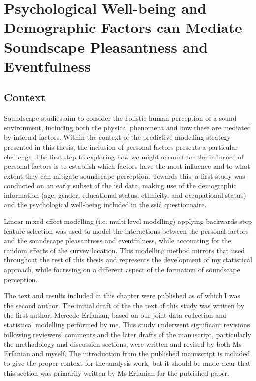 \chapter{Psychological Well-being and Demographic Factors can Mediate Soundscape Pleasantness and Eventfulness}
\label{ch:whostudy}

\section*{Context}

Soundscape studies aim to consider the holistic human perception of a sound environment, including both the physical phenomena and how these are mediated by internal factors. Within the context of the predictive modelling strategy presented in this thesis, the inclusion of personal factors presents a particular challenge. The first step to exploring how we might account for the influence of personal factors is to establish which factors have the most influence and to what extent they can mitigate soundscape perception. Towards this, a first study was conducted on an early subset of the \gls{isd} data, making use of the demographic information (age, gender, educational status, ethnicity, and occupational status) and the psychological well-being included in the \gls{ssid} questionnaire.

Linear mixed-effect modelling (i.e. multi-level modelling) applying backwards-step feature selection was used to model the interactions between the personal factors and the soundscape pleasantness and eventfulness, while accounting for the random effects of the survey location. This modelling method mirrors that used throughout the rest of this thesis and represents the development of my statistical approach, while focussing on a different aspect of the formation of soundscape perception.

The text and results included in this chapter were published as \citep{Erfanian2021Psychological} of which I was the second author. The initial draft of the the text of this study was written by the first author, Mercede Erfanian, based on our joint data collection and statistical modelling performed by me. This study underwent significant revisions following reviewers' comments and the later drafts of the manuscript, particularly the methodology and discussion sections, were written and revised by both Ms Erfanian and myself. The introduction from the published manuscript is included to give the proper context for the analysis work, but it should be made clear that this section was primarily written by Ms Erfanian for the published paper.

